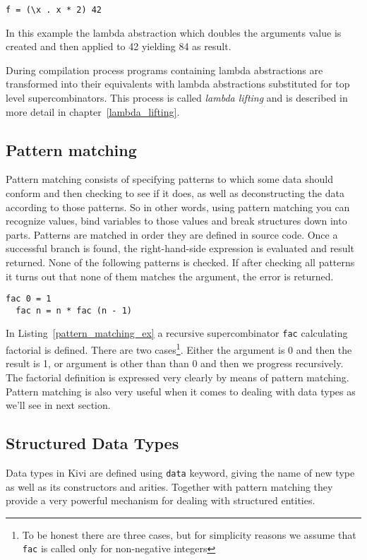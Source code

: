 \documentclass[a4paper]{report}
\begin{document}
\begin{lstlisting}[label=lambda_ex,caption={Lambda abstraction}]
  f = (\x . x * 2) 42
\end{lstlisting}

In this example the lambda abstraction which doubles the arguments value is
created and then applied to 42 yielding 84 as result.

During compilation process programs containing lambda abstractions are
transformed into their equivalents with lambda abstractions substituted for top
level supercombinators. This process is called \textit{lambda lifting} and is
described in more detail in chapter~\ref{lambda_lifting}.

\subsection{Pattern matching}

Pattern matching consists of specifying patterns to which some data should
conform and then checking to see if it does, as well as deconstructing the data
according to those patterns. So in other words, using pattern matching you can
recognize values, bind variables to those values and break structures down into
parts.
Patterns are matched in order they are defined in source code. Once a
successful branch is found, the right-hand-side expression is evaluated and
result returned. None of the following patterns is checked. If after checking
all patterns it turns out that none of them matches the argument, the error is
returned.

\begin{lstlisting}[label=pattern_matching_ex,caption={Factorial using pattern matching.}]
  fac 0 = 1
  fac n = n * fac (n - 1)
\end{lstlisting}

In Listing~\ref{pattern_matching_ex} a recursive supercombinator \texttt{fac}
calculating factorial is defined. There are two cases\footnote{To be honest
there are three cases, but for simplicity reasons we assume that
\texttt{fac} is called only for non-negative integers}. Either the
argument is 0 and then the result is 1, or argument is other than than 0 and
then we progress recursively. The factorial definition is expressed very
clearly by means of pattern matching.
Pattern matching is also very useful when it comes to dealing with data
types as we'll see in next section.

\subsection{Structured Data Types}
Data types in Kivi are defined using \texttt{data} keyword, giving the name of
new type as well as its constructors and arities. Together with pattern matching they
provide a very powerful mechanism for dealing with structured entities.
\end{document}
